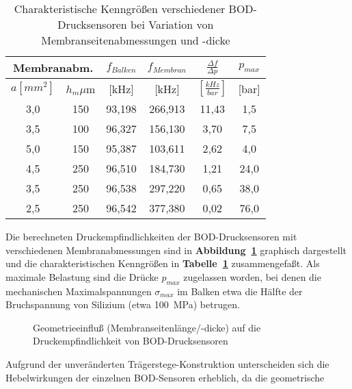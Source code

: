 \begin{table}[htb]
\caption{\label{tabbodabm}
 Charakteristische Kenngrößen verschiedener BOD-Drucksensoren bei
 Variation von Membranseitenabmessungen und -dicke}
\begin{center}
\begin{tabular}{|c|c||c|c||c|c|}
\hline
 \multicolumn{2}{|c||}{Membranabm.} & $f_{Balken}$ & $f_{Membran}$  &
 $\frac{\Delta f}{\Delta p}$  &  $p_{max}$ \\
\hline
 $a [mm^{2}]$   &  $h_{m} \mu$m  &  [kHz]  &  [kHz] &
 $[\frac{kHz}{bar}]$ & [bar] \\
\hline \hline
 3,0 & 150 & 93,198 & 266,913 & 11,43 & 1,5 \\
 3,5 & 100 & 96,327 & 156,130 &  3,70 & 7,5 \\
\hline
 5,0 & 150 & 95,387 & 103,611 &  2,62 & 4,0 \\
\hline
 4,5 & 250 & 96,510 & 184,730 &  1,21 & 24,0 \\
 3,5 & 250 & 96,538 & 297,220 &  0,65 & 38,0 \\
 2,5 & 250 & 96,542 & 377,380 &  0,02 & 76,0 \\
\hline
\end{tabular}
\end{center}
\end{table}
Die berechneten Druckempfindlichkeiten der BOD-Drucksensoren mit
verschiedenen Membranabmessungen sind in {\bf Abbildung~\ref{abbbodabm}}
graphisch dargestellt und die charakteristischen Kenngrößen in
{\bf Tabelle~\ref{tabbodabm}} zusammengefaßt. Als maximale Belastung
sind die Drücke $p_{max}$ zugelassen worden, bei denen die mechanischen
Maximalspannungen $\sigma_{max}$ im Balken etwa die Hälfte der Bruchspannung
von Silizium (etwa 100~MPa) betrugen.
\begin{figure}[htb]

\begin{center}

\setabbssz
\end{center}
\caption{\label{abbbodabm}
 Geometrieeinfluß (Membranseitenlänge/-dicke) auf die Druckempfindlichkeit
 von BOD-Drucksensoren}
\end{figure}
Aufgrund der unveränderten Trägerstege-Konstruktion unterscheiden sich
die Hebelwirkungen der einzelnen BOD-Sensoren erheblich, da die geometrische
